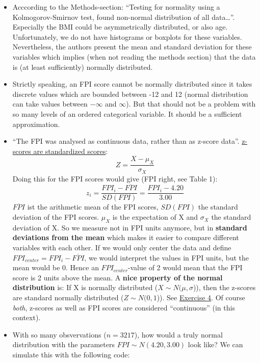 \documentclass[
]{book}
\begin{document}
\begin{itemize}
\item
  Acccording to the Methods-section:
  ``Testing for normality using a Kolmogorov-Smirnov test,
  found non-normal distribution of all data\ldots{}''.
  Especially the BMI could be asymmetrically distributed, or also age. Unfortunately, we do not have
  histograms or boxplots for these variables. Nevertheless, the authors present the mean and standard deviation
  for these variables which implies (when not reading the methods section) that the data is (at least sufficiently)
  normally distributed.
\item
  Strictly speaking, an FPI score cannot be normally distributed since it takes discrete values which are bounded
  between -12 and 12 (normal distribution can take values between \(-\infty\) and \(\infty\)). But that should not be a problem with so many levels of an ordered categorical variable.
  It should be a sufficient approximation.
\item
  ``The FPI was analysed as continuous data, rather than as z-score data''.
  \href{https://www.youtube.com/watch?v=5S-Zfa-vOXs&ab_channel=KhanAcademy}{z-scores are standardized scores}:
  \[Z = \frac{X - \mu_X}{\sigma_X}\]
  Doing this for the FPI scores would give (FPI right, see Table 1):
  \[z_i = \frac{FPI_i - \overline{FPI}}{SD(FPI)} = \frac{FPI_i - 4.20}{3.00}\]
  \(\overline{FPI}\) ist the arithmetic mean of the FPI scores, \(SD(FPI)\) the standard deviation of the FPI scores.
  \(\mu_X\) is the expectation of X and \(\sigma_X\) the standard deviation of X.
  So we measure not in FPI units anymore, but in \textbf{standard deviations from the mean} which makes
  it easier to compare different variables with each other. If we would only center the data and
  define \(FPI_{center} = FPI_i - \overline{FPI}\), we would interpret the values in FPI units, but
  the mean would be 0. Hence an \(FPI_{center}\)-value of 2 would mean that the FPI score is 2 units above the mean.
  A \textbf{nice property of the normal distribution} is: If X is normally distributed (\(X \sim N(\mu, \sigma\))),
  then the z-scores are standard normally distributed (\(Z \sim N(0,1\))).
  See \hyperref[exercise4_descriptive_stats]{Exercise 4}. Of course \emph{both}, z-scores as well as FPI scores are
  considered ``continuous'' (in this context).
\item
  With so many obsvervations (\(n=3217\)), how would a truly normal distribution with the parameters
  \(FPI \sim N(4.20, 3.00)\) look like? We can simulate this with the following code:
\end{itemize}
\end{document}
